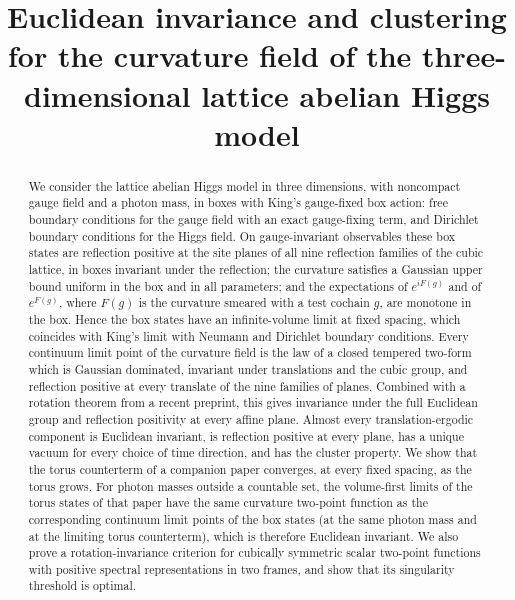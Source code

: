 \documentclass[11pt]{amsart}
\theoremstyle{plain}
\theoremstyle{definition}
\theoremstyle{remark}
\numberwithin{equation}{section}
\begin{document}
\title[Euclidean invariance of the curvature field]{Euclidean invariance and clustering for the curvature field of the three-dimensional lattice abelian Higgs model}
\author{}
\date{}

\begin{abstract}
We consider the lattice abelian Higgs model in three dimensions, with noncompact gauge field and a photon mass, in boxes with King's gauge-fixed box action: free boundary conditions for the gauge field with an exact gauge-fixing term, and Dirichlet boundary conditions for the Higgs field. On gauge-invariant observables these box states are reflection positive at the site planes of all nine reflection families of the cubic lattice, in boxes invariant under the reflection; the curvature satisfies a Gaussian upper bound uniform in the box and in all parameters; and the expectations of $e^{iF(g)}$ and of $e^{F(g)}$, where $F(g)$ is the curvature smeared with a test cochain $g$, are monotone in the box. Hence the box states have an infinite-volume limit at fixed spacing, which coincides with King's limit with Neumann and Dirichlet boundary conditions. Every continuum limit point of the curvature field is the law of a closed tempered two-form which is Gaussian dominated, invariant under translations and the cubic group, and reflection positive at every translate of the nine families of planes. Combined with a rotation theorem from a recent preprint, this gives invariance under the full Euclidean group and reflection positivity at every affine plane. Almost every translation-ergodic component is Euclidean invariant, is reflection positive at every plane, has a unique vacuum for every choice of time direction, and has the cluster property. We show that the torus counterterm of a companion paper converges, at every fixed spacing, as the torus grows. For photon masses outside a countable set, the volume-first limits of the torus states of that paper have the same curvature two-point function as the corresponding continuum limit points of the box states (at the same photon mass and at the limiting torus counterterm), which is therefore Euclidean invariant. We also prove a rotation-invariance criterion for cubically symmetric scalar two-point functions with positive spectral representations in two frames, and show that its singularity threshold is optimal.
\end{abstract}

\maketitle
\end{document}
